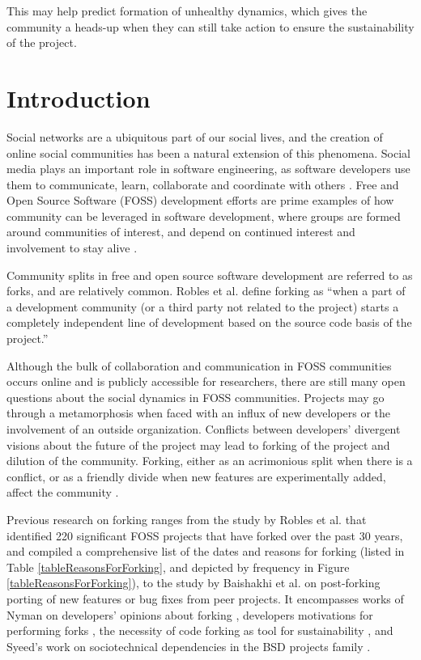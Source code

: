 \documentclass[11pt]{report}
\begin{document}
This may help predict formation of unhealthy dynamics, which gives the community a heads-up when they can still take action to ensure the sustainability of the project.

\pagebreak

\section{Introduction}
\label{introduction}
Social networks are a ubiquitous part of our social lives, and the creation of online social communities has been a natural extension of this phenomena. Social media plays an important role in software engineering, as software developers use them to communicate, learn, collaborate and coordinate with others \cite{Storey}. Free and Open Source Software (FOSS) development efforts are prime examples of how community can be leveraged in software development, where groups are formed around communities of interest, and depend on continued interest and involvement to stay alive \cite{NymanCodeForking}.

Community splits in free and open source software development are referred to as forks, and are relatively common. Robles et al. \cite{Robles} define forking as ``when a part of a development community (or a third party not related to the project) starts a completely independent line of development based on the source code basis of the project.'' 

Although the bulk of collaboration and communication in FOSS communities occurs online and is publicly accessible for researchers, there are still many open questions about the social dynamics in FOSS communities. Projects may go through a metamorphosis when faced with an influx of new developers or the involvement of an outside organization. Conflicts between developers' divergent visions about the future of the project may lead to forking of the project and dilution of the community. Forking, either as an acrimonious split when there is a conflict, or as a friendly divide when new features are experimentally added, affect the community \cite{Bezrukova}.

Previous research on forking ranges from the study by Robles et al. \cite{Robles} that identified 220 significant FOSS projects that have forked over the past 30 years, and compiled a comprehensive list of the dates and reasons for forking (listed in Table \ref{tableReasonsForForking}, and depicted by frequency in Figure \ref{tableReasonsForForking}), to the study by Baishakhi et al. \cite{Baishakhi} on post-forking porting of new features or bug fixes from peer projects. It encompasses works of Nyman on developers' opinions about forking \cite{NymanHackersForking}, developers motivations for performing forks \cite{NymanToForkOrNotToFork}, the necessity of code forking as tool for sustainability \cite{NymanForkingSustainability}, and Syeed's work on sociotechnical dependencies in the BSD projects family \cite{Syeed}.
\end{document}

